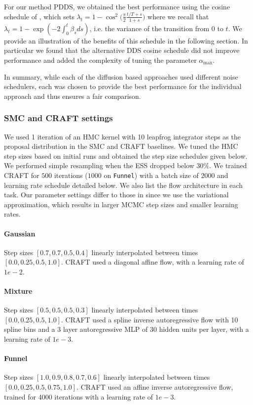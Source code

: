 \documentclass{article}
\theoremstyle{plain}
\theoremstyle{definition}
\theoremstyle{remark}
\begin{document}
For our method PDDS, we obtained the best performance using the cosine schedule of \citet{nichol2021improved}, which sets $\lambda_t = 1 - \cos^2\big(\frac{\pi}{2} \frac{t/T + s}{1+s}\big)$ where we recall that $\lambda_t = 1 - \exp(-2\int_{0}^{t} \beta_s ds)$, i.e. the variance of the transition from $0$ to $t$. We provide an illustration of the benefits of this schedule in the following section. In particular we found that the alternative DDS cosine schedule did not improve performance and added the complexity of tuning the parameter $\alpha_\text{max}$.

In summary, while each of the diffusion based approaches used different noise schedulers, each was chosen to provide the best performance for the individual approach and thus ensures a fair comparison.

\subsubsection{SMC and CRAFT settings}

We used 1 iteration of an HMC kernel with 10 leapfrog integrator steps as the proposal distribution in the SMC and CRAFT baselines. We tuned the HMC step sizes based on initial runs and obtained the step size schedules given below. We performed simple resampling when the ESS dropped below $30\%$. We trained CRAFT for $500$ iterations ($1000$ on \verb|Funnel|) with a batch size of $2000$ and learning rate schedule detailed below.  We also list the flow architecture in each task. Our parameter settings differ to those in \citet{Matthews2022} since we use the variational approximation, which results in larger MCMC step sizes and smaller learning rates.

\paragraph{Gaussian} Step sizes $[0.7, 0.7, 0.5, 0.4]$ linearly interpolated between times $[0.0, 0.25, 0.5, 1.0]$. CRAFT used a diagonal affine flow, with a learning rate of $1e-2$.
\paragraph{Mixture} Step sizes $[0.5, 0.5, 0.5, 0.3]$ linearly interpolated between times $[0.0, 0.25, 0.5, 1.0]$. CRAFT used a spline inverse autoregressive flow with 10 spline bins and a 3 layer autoregressive MLP of 30 hidden units per layer, with a learning rate of $1e-3$.
\paragraph{Funnel} Step sizes $[1.0, 0.9, 0.8, 0.7, 0.6]$ linearly interpolated between times $[0.0, 0.25, 0.5, 0.75, 1.0]$. CRAFT used an affine inverse autoregressive flow, trained for 4000 iterations with a learning rate of $1e-3$.
\end{document}
